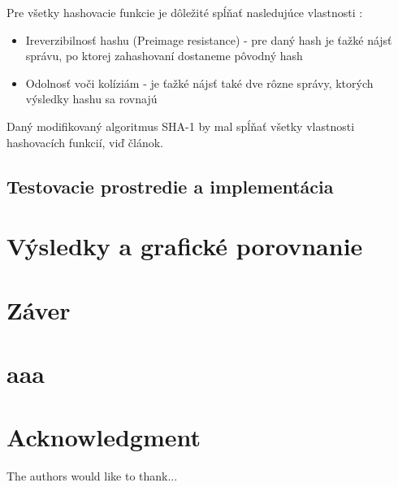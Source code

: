 \documentclass[conference]{IEEEtran}
\begin{document}
Pre všetky hashovacie funkcie je dôležité spĺňať nasledujúce vlastnosti \cite{CHF}:

\begin{itemize}
	\item{Ireverzibilnosť hashu (Preimage resistance) - pre daný hash je ťažké nájsť správu, po ktorej zahashovaní dostaneme pôvodný hash}
	\item{Odolnosť voči kolíziám - je ťažké nájsť také dve rôzne správy, ktorých výsledky hashu sa rovnajú}
\end{itemize}

Daný modifikovaný algoritmus SHA-1 by mal spĺňať všetky vlastnosti hashovacích funkcií, viď článok\cite{MSHA}.


\subsection{Testovacie prostredie a implementácia}

\section{Výsledky a grafické porovnanie}

\section{Záver}


\appendices
\section{aaa}



\section*{Acknowledgment}


The authors would like to thank...


\ifCLASSOPTIONcaptionsoff
  \newpage
\fi
\end{document}
